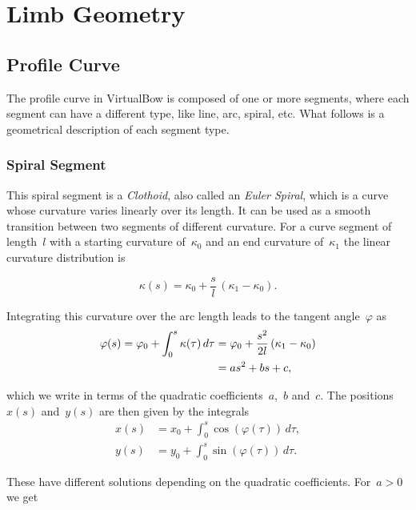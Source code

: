 
\chapter{Limb Geometry}

\section{Profile Curve}

The profile curve in VirtualBow is composed of one or more segments, where each segment can have a different type, like line, arc, spiral, etc.
What follows is a geometrical description of each segment type.

\subsection{Spiral Segment}

This spiral segment is a \textit{Clothoid}, also called an \textit{Euler Spiral}, which is a curve whose curvature varies linearly over its length.
It can be used as a smooth transition between two segments of different curvature.
For a curve segment of length~$l$ with a starting curvature of~$\kappa_0$ and an end curvature of~$\kappa_1$ the linear curvature distribution is

\begin{equation}
\kappa(s) = \kappa_0 + \frac{s}{l}\,(\kappa_1 - \kappa_0).
\end{equation}

Integrating this curvature over the arc length leads to the tangent angle~$\varphi$ as
%
\begin{align}
\varphi(s) = \varphi_0 + \int_{0}^{s} \kappa(\tau)\,d\tau &= \varphi_0 + \frac{s^2}{2l}\,(\kappa_1 - \kappa_0) \notag \\
&= as^2 + bs + c,
\end{align}

which we write in terms of the quadratic coefficients~$a$,~$b$ and~$c$.
The positions~$x(s)$ and~$y(s)$ are then given by the integrals
%
\begin{align}
x(s) &= x_0 + \int_{0}^{s} \cos(\varphi(\tau))\,d\tau, \\
y(s) &= y_0 + \int_{0}^{s} \sin(\varphi(\tau))\,d\tau.
\end{align}

These have different solutions depending on the quadratic coefficients.
For~$a > 0$ we get


